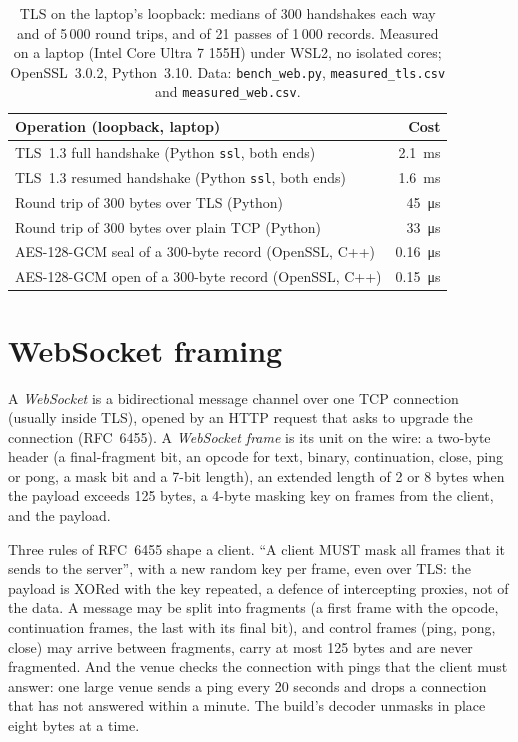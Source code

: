 \begin{table}[ht]
\centering\small
\begin{tabular}{lr}
\toprule
Operation (loopback, laptop) & Cost \\
\midrule
TLS~1.3 full handshake (Python \texttt{ssl}, both ends) & \qty{2.1}{\milli\second} \\
TLS~1.3 resumed handshake (Python \texttt{ssl}, both ends) & \qty{1.6}{\milli\second} \\
Round trip of 300 bytes over TLS (Python) & \qty{45}{\micro\second} \\
Round trip of 300 bytes over plain TCP (Python) & \qty{33}{\micro\second} \\
AES-128-GCM seal of a 300-byte record (OpenSSL, C++) & \qty{0.16}{\micro\second} \\
AES-128-GCM open of a 300-byte record (OpenSSL, C++) & \qty{0.15}{\micro\second} \\
\bottomrule
\end{tabular}
\caption{TLS on the laptop's loopback: medians of 300 handshakes each way and of 5\,000 round trips, and of 21 passes of
1\,000 records. Measured on a laptop (Intel Core Ultra 7 155H) under WSL2, no isolated cores; OpenSSL~3.0.2, Python~3.10.
Data: \texttt{bench\_web.py}, \texttt{measured\_tls.csv} and \texttt{measured\_web.csv}.}\label{tab:ll:websocket-rest-tls-and-json-at-speed:tls}
\end{table}

\section{WebSocket framing}

\begin{definition}\label{def:ll:websocket-rest-tls-and-json-at-speed:ws}
A \emph{WebSocket} is a bidirectional message channel over one TCP connection (usually inside TLS), opened by
an HTTP request that asks to upgrade the connection (RFC~6455). A \emph{WebSocket frame} is its unit
on the wire: a two-byte header (a final-fragment bit, an opcode for text, binary, continuation, close, ping or pong, a mask
bit and a 7-bit length), an extended length of 2 or 8 bytes when the payload exceeds 125 bytes, a 4-byte masking key on frames
from the client, and the payload.
\end{definition}

Three rules of RFC~6455 shape a client. ``A client MUST mask all frames that it sends to the server'', with a new random key
per frame, even over TLS: the payload is XORed with the key repeated, a defence of intercepting proxies, not of the data. A
message may be split into fragments (a first frame with the opcode, continuation frames, the last with its final bit), and
control frames (ping, pong, close) may arrive between fragments, carry at most 125 bytes and are never fragmented. And the
venue checks the connection with pings that the client must answer: one large venue sends a ping every 20 seconds and drops
a connection that has not answered within a minute. The build's decoder unmasks in place eight bytes at a time.

